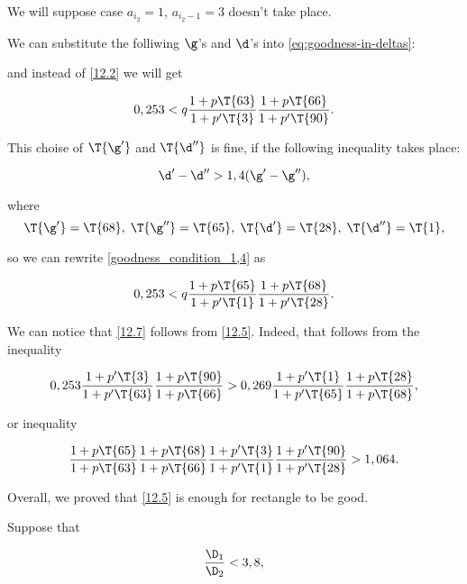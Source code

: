 
We will suppose case $a_{i_2} = 1$, $a_{i_2 - 1} = 3$ doesn't take place.

We can substitute the folliwing $\g$'s and $\d$'s
into \ref{eq:goodness-in-deltas}:
%

and instead of \ref{12.2} we will get

\begin{equation}\label{12.5}
	0,253 < q
	\dfrac{1 + p \T{63}}{1 + p' \T{3}}
	\dfrac{1 + p \T{66}}{1 + p' \T{90}}.
\end{equation}

This choise of $\T{\g'}$ and $\T{\d''}$ is fine,
if the following inequality takes place:

\begin{equation}\label{goodness_condition_1,4}
	\d' - \d'' > 1,4 (\g' - \g''),
\end{equation}

where 
\begin{equation*}
	\T{\g'} = \T{68},\;
	\T{\g''} = \T{65},\;
	\T{\d'} = \T{28},\;
	\T{\d''} = \T{1},
\end{equation*}

so we can rewrite \ref{goodness_condition_1,4} as

\begin{equation}\label{12.7}
	0,253 < q
	\dfrac{1 + p \T{65}}{1 + p' \T{1}}
	\dfrac{1 + p \T{68}}{1 + p' \T{28}}.
\end{equation}

We can notice that \ref{12.7} follows from \ref{12.5}. Indeed, that follows from the inequality

\begin{equation*}
	0,253
	\dfrac{1 + p' \T{3}}{1 + p' \T{63}}
	\dfrac{1 + p \T{90}}{1 + p \T{66}}
	>
	0,269
	\dfrac{1 + p' \T{1}}{1 + p' \T{65}}
	\dfrac{1 + p \T{28}}{1 + p \T{68}},
\end{equation*}

or inequality

\begin{equation*}
	\dfrac{1 + p \T{65}}{1 + p \T{63}}
	\dfrac{1 + p \T{68}}{1 + p \T{66}}
	\dfrac{1 + p' \T{3}}{1 + p' \T{1}}
	\dfrac{1 + p' \T{90}}{1 + p' \T{28}}
	>
	1,064.
\end{equation*}

Overall, we proved that \ref{12.5} is enough for rectangle to be good.

Suppose that

\begin{equation}\label{goodness_condition_3,8}
	\dfrac{\D_1}{\D_2} < 3,8,
\end{equation}

